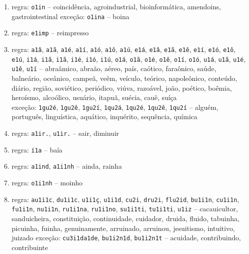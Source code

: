 \documentclass{article}
\begin{document}
\begin{enumerate}
\item\label{rulegrp_oin} regra: \texttt{o1in} -- coincidência, agroindustrial, bioinformática, amendoins, gastrointestinal
exceção: \texttt{o1ina} -- boina

\item\label{rulegrp_eim} regra: \texttt{e1imp} -- reimpresso%

\item\label{rulegrp_aa} regra: \texttt{a1â}, \texttt{a1ã}, \texttt{a1é}, \texttt{a1í}, \texttt{a1ó}, \texttt{a1ô}, \texttt{a1ú}, \texttt{e1á}, \texttt{e1â}, \texttt{e1ã}, \texttt{e1ê}, \texttt{e1í}, \texttt{e1ó}, \texttt{e1ô}, \texttt{e1ú}, \texttt{i1á}, \texttt{i1ã}, \texttt{i1ã}, \texttt{i1é}, \texttt{i1ó}, \texttt{i1ú}, \texttt{o1á}, \texttt{o1ã}, \texttt{o1é}, \texttt{o1ê}, \texttt{o1í}, \texttt{o1ó}, \texttt{u1á}, \texttt{u1ã}, \texttt{u1é}, \texttt{u1ê}, \texttt{u1í} --  abraâmico, abraão, aéreo, país, caótico, faraônico, saúde, balneário, oceânico, campeã, veêm, veículo, teórico, napoleônico, conteúdo, diário, região, soviético, periódico, viúva, razoável, joão, poético, boêmia, heroísmo, alcoólico, usuário, itapuã, suécia, cauê, suíça \\
exceção: \texttt{1gu2é}, \texttt{1gu2ê}, \texttt{1gu2í}, \texttt{1qu2á}, \texttt{1qu2é}, \texttt{1qu2ê}, \texttt{1qu2í} -- alguém, português, linguística, aquático, inquérito, sequência, química

\item\label{rulegrp_air} regra: \texttt{a1ir.}, \texttt{u1ir.} -- sair, diminuir

\item\label{rulegrp_ia} regra: \texttt{í1a} -- baía

\item\label{rulegrp_ain} regra: \texttt{a1ind}, \texttt{a1i1nh} -- ainda, rainha

\item\label{rulegrp_oin} regra: \texttt{o1i1nh} -- moinho

\item\label{rulegrp_aui} regra: \texttt{au1i1c}, \texttt{du1i1c}, \texttt{u1i1ç}, \texttt{u1i1d}, \texttt{cu2i}, \texttt{dru2i}, \texttt{flu2id}, \texttt{bu1i1n}, \texttt{cu1i1n}, \texttt{fu1i1n}, \texttt{nu1i1n}, \texttt{ru1i1na}, \texttt{ru1i1no}, \texttt{su1i1ti}, \texttt{tu1i1ti}, \texttt{u1iz} -- cacauicultor, sanduicheira, constituição, continuidade, cuidador, druida, fluido, tabuinha, picuinha, fuinha, genuinamente, arruinado, arruinou, jesuitismo, intuitivo, juizado 
exceção: \texttt{cu3i1da1de}, \texttt{bu1i2n1d}, \texttt{bu1i2n1t}  -- acuidade, contribuindo, contribuinte


\end{enumerate}
\end{document}
